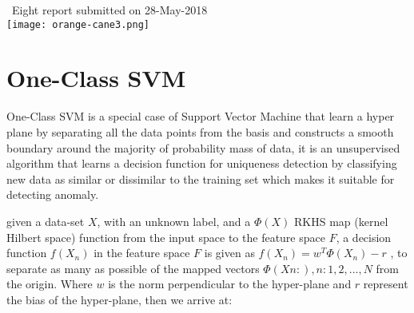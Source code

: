 \documentclass[a4paper, parskip=full]{scrartcl}
\begin{document}
\begin{titlepage}
	
	
	{\large \ Eight report submitted on 28-May-2018}\\[0.2cm] %
	
	
	\texttt{[image: orange-cane3.png]}\\[0.2cm] %
	
	
	\vfill %
	
\end{titlepage}







 \section*{One-Class SVM}
 
One-Class SVM is a special case of Support Vector Machine that learn a hyper plane by separating all the data points from the basis and constructs a smooth boundary around the majority of probability mass of data, it is an unsupervised algorithm that learns a decision function for uniqueness detection by classifying new data as similar or dissimilar to the training set which makes it suitable for detecting anomaly.

given a  data-set $X$, with an unknown label, and a $\Phi(X)$  RKHS map (kernel Hilbert space) function from the input space to the feature space $F$, a decision function $f(X_n)$ in the feature space $F$ is given as $f(X_n) = w^T\Phi(X_n) -r$ , to separate as many as possible of the mapped vectors $\Phi(X n: ),n : 1, 2, ...,N$ from the origin. Where $w$ is the norm perpendicular to the hyper-plane and $r$ represent the bias of the hyper-plane, then we arrive at:
\end{document}
